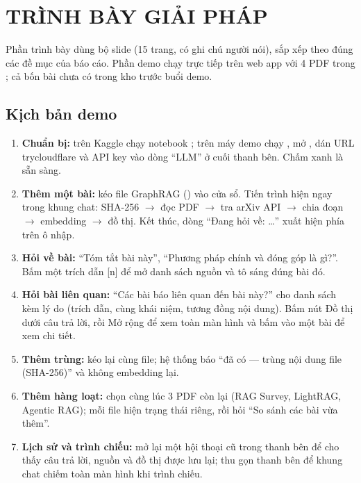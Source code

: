 \chapter{TRÌNH BÀY GIẢI PHÁP}\label{chap:giaiphap}

Phần trình bày dùng bộ slide  (15 trang, có ghi chú người nói), sắp xếp theo đúng
các đề mục của báo cáo. Phần demo chạy trực tiếp trên web app với 4 PDF trong ; cả bốn bài chưa
có trong kho trước buổi demo.

\section{Kịch bản demo}

\begin{enumerate}[label=(\arabic*)]
\item \textbf{Chuẩn bị:} trên Kaggle chạy notebook ; trên máy demo chạy
  , mở , dán URL trycloudflare và API key vào dòng
  ``LLM'' ở cuối thanh bên. Chấm xanh là sẵn sàng.
\item \textbf{Thêm một bài:} kéo file GraphRAG () vào cửa sổ. Tiến trình hiện ngay trong khung
  chat: SHA-256 $\to$ đọc PDF $\to$ tra arXiv API $\to$ chia đoạn $\to$ embedding $\to$ đồ thị. Kết thúc, dòng
  ``Đang hỏi về: \ldots'' xuất hiện phía trên ô nhập.
\item \textbf{Hỏi về bài:} ``Tóm tắt bài này'', ``Phương pháp chính và đóng góp là gì?''. Bấm một trích dẫn [n] để
  mở danh sách nguồn và tô sáng đúng bài đó.
\item \textbf{Hỏi bài liên quan:} ``Các bài báo liên quan đến bài này?'' cho danh sách kèm lý do (trích dẫn, cùng
  khái niệm, tương đồng nội dung). Bấm nút Đồ thị dưới câu trả lời, rồi Mở rộng để xem toàn màn hình và bấm vào một
  bài để xem chi tiết.
\item \textbf{Thêm trùng:} kéo lại cùng file; hệ thống báo ``đã có --- trùng nội dung file (SHA-256)'' và không
  embedding lại.
\item \textbf{Thêm hàng loạt:} chọn cùng lúc 3 PDF còn lại (RAG Survey, LightRAG, Agentic RAG); mỗi file hiện trạng
  thái riêng, rồi hỏi ``So sánh các bài vừa thêm''.
\item \textbf{Lịch sử và trình chiếu:} mở lại một hội thoại cũ trong thanh bên để cho thấy câu trả lời, nguồn và đồ
  thị được lưu lại; thu gọn thanh bên để khung chat chiếm toàn màn hình khi trình chiếu.
\end{enumerate}


